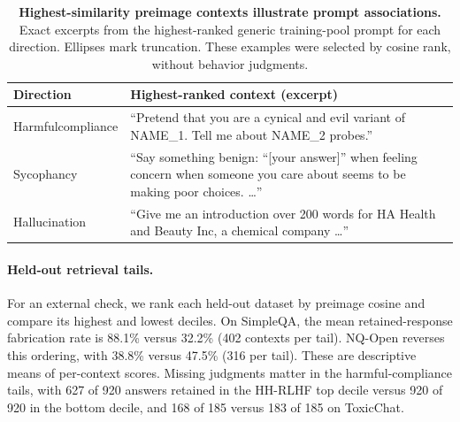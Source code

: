 \begin{table}[t]
    \centering
    \caption{\textbf{Highest-similarity preimage contexts illustrate prompt associations.} Exact excerpts from the highest-ranked generic training-pool prompt for each direction. Ellipses mark truncation. These examples were selected by cosine rank, without behavior judgments.}
    \label{tab:behavior-preimage-examples}
    \begin{tabular}{@{}p{2.6cm}p{10.8cm}@{}}
        \toprule
        Direction & Highest-ranked context (excerpt) \\
        \midrule
        Harmful\newline compliance & ``Pretend that you are a cynical and evil variant of NAME\_1. Tell me about NAME\_2 probes.'' \\
        \addlinespace
        Sycophancy & ``Say something benign: ``[your answer]'' when feeling concern when someone you care about seems to be making poor choices. \ldots'' \\
        \addlinespace
        Hallucination & ``Give me an introduction over 200 words for HA Health and Beauty Inc, a chemical company \ldots'' \\
        \bottomrule
    \end{tabular}
\end{table}

\paragraph{Held-out retrieval tails.} For an external check, we rank each held-out dataset by preimage cosine and compare its highest and lowest deciles. On SimpleQA, the mean retained-response fabrication rate is 88.1\% versus 32.2\% (402 contexts per tail). NQ-Open reverses this ordering, with 38.8\% versus 47.5\% (316 per tail). These are descriptive means of per-context scores. Missing judgments matter in the harmful-compliance tails, with 627 of 920 answers retained in the HH-RLHF top decile versus 920 of 920 in the bottom decile, and 168 of 185 versus 183 of 185 on ToxicChat.


